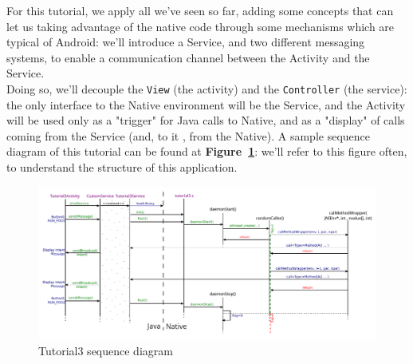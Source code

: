 \documentclass[a4paper,10pt]{article}
\newcommand{\keyword}[1]{\texttt{#1}}
\newcommand{\reff}[1]{\textbf{Figure~\ref{#1}}}
\begin{document}
\begin{multicols}{2}
For this tutorial, we apply all we've seen so far, adding some concepts that can
let us taking advantage of the native code through some mechanisms which are
typical of Android: we'll introduce a Service, and two different messaging
systems, to enable a communication channel between the Activity and the Service.
\\Doing so, we'll decouple the \keyword{View} (the activity) and the 
\keyword{Controller} (the service): the only interface to the Native environment
will be the Service, and the Activity will be used only as a "trigger" for Java
calls to Native, and as a "display" of calls coming from the Service (and, to it
, from the Native). A sample sequence diagram of this tutorial can be found at
\reff{fig:tut3-seq}: we'll refer to this figure often, to understand the
structure of this application.

\begin{figure}[t]
 \includegraphics[width=17cm]{./figures/sequence_t3.pdf}
 \caption{Tutorial3 sequence diagram}
 \label{fig:tut3-seq}
\end{figure}


\end{multicols}
\end{document}
